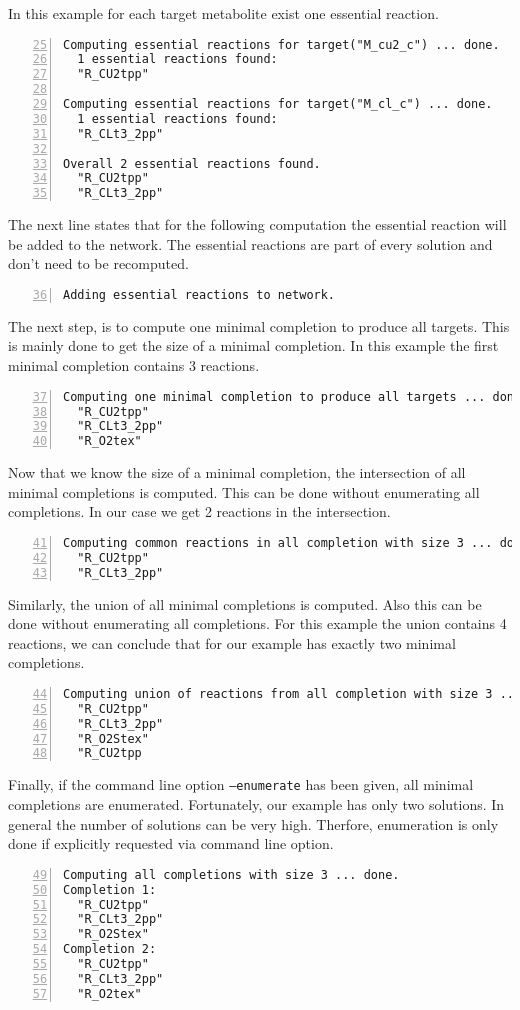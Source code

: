\documentclass{article}
\begin{document}
In this example for each target metabolite exist one essential reaction.
\begin{Verbatim}[frame=single,numbers=left,firstnumber=25]
Computing essential reactions for target("M_cu2_c") ... done.
  1 essential reactions found:
  "R_CU2tpp"

Computing essential reactions for target("M_cl_c") ... done.
  1 essential reactions found:
  "R_CLt3_2pp"

Overall 2 essential reactions found.
  "R_CU2tpp"
  "R_CLt3_2pp"
\end{Verbatim}
The next line states that for the following computation the essential reaction will be added to the network.
The essential reactions are part of every solution and don't need to be recomputed.
\begin{Verbatim}[frame=single,numbers=left,firstnumber=36]
Adding essential reactions to network.
\end{Verbatim}
The next step, is to compute one minimal completion to produce all targets.
This is mainly done to get the size of a minimal completion.
In this example the first minimal completion contains 3 reactions.
\begin{Verbatim}[frame=single,numbers=left,firstnumber=37]
Computing one minimal completion to produce all targets ... done.
  "R_CU2tpp"
  "R_CLt3_2pp"
  "R_O2tex"
\end{Verbatim}
Now that we know the size of a minimal completion, the intersection of all minimal completions is computed.
This can be done without enumerating all completions.
In our case we get 2 reactions in the intersection.
\begin{Verbatim}[frame=single,numbers=left,firstnumber=41]
Computing common reactions in all completion with size 3 ... done.
  "R_CU2tpp"
  "R_CLt3_2pp"
\end{Verbatim}
Similarly, the union of all minimal completions is computed.
Also this can be done without enumerating all completions.
For this example the union contains 4 reactions, we can conclude that for our example has exactly two minimal completions.
\begin{Verbatim}[frame=single,numbers=left,firstnumber=44]
Computing union of reactions from all completion with size 3 ... done.
  "R_CU2tpp"
  "R_CLt3_2pp"
  "R_O2Stex"
  "R_CU2tpp  
\end{Verbatim}
Finally, if the command line option \texttt{--enumerate} has been given,
all minimal completions are enumerated.
Fortunately, our example has only two solutions.
In general the number of solutions can be very high.
Therfore, enumeration is only done if explicitly requested via command line option.
\begin{Verbatim}[frame=single,numbers=left,firstnumber=49]
Computing all completions with size 3 ... done.
Completion 1:
  "R_CU2tpp"
  "R_CLt3_2pp"
  "R_O2Stex"
Completion 2:
  "R_CU2tpp"
  "R_CLt3_2pp"
  "R_O2tex"
\end{Verbatim}

\nocite{schthi09a,sthiele13c}


\end{document}
